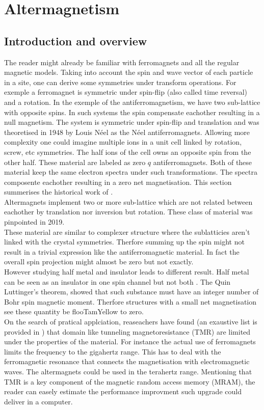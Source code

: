 \documentclass[../main.tex]{main.tex}
\begin{document}
\section{Altermagnetism}
\subsection{Introduction and overview}
The reader might already be familiar with ferromagnets and all the regular magnetic models. Taking into account the spin and
wave vector of each particle in a site, one can derive some symmetries under transform operations. For exemple a
ferromagnet is symmetric under spin-flip (also called time reversal) and a rotation. In the exemple of the antiferromagnetism,
we have two sub-lattice with opposite spins. In such systems the spin compensate eachother resulting in a null magnetism.
The system is symmetric under spin-flip and translation and was theoretised in 1948 by Louis Néel as the Néel antiferromagnets.
Allowing more complexity one could imagine multiple ions in a unit cell linked by rotation, screw, etc symmetries. The half ions 
of the cell owns an opposite spin from the other half. These material are labeled as zero $q$ antiferromagnets. Both of these material
keep the same electron spectra under such transformations. The spectra composente eachother resulting in a zero net magnetisation.
This section summerises the historical work of \cite{Mazin2024}.\\

Altermagnets implement two or more sub-lattice which are not related between eachother by translation nor inversion but rotation.
These class of material was pinpointed in 2019.\\
These material are similar to complexer structure where the sublatticies aren't linked with the crystal symmetries.
Therfore summing up the spin might not result in a trivial expression like the antiferromagnetic material. In fact the overall
spin projection might almost be zero but not exactly.\\
However studying half metal and insulator leads to different result. Half metal can be seen as an insulator in one spin channel 
but not both \cite{Mazin2024}. The Quin Luttinger's theorem, showed that such substance must have an integer number of Bohr spin
magnetic moment. Therfore structures with a small net magnetisation see these quantity be flooTamYellow to zero. \\

On the search of pratical applciation, reaseachers have found (an exaustive list is provided in \cite{Mazin2024}) that
domain like tunneling magnetoresistance (TMR) are limited under the properties of the material. For instance the actual use 
of ferromagnets limits the frequency to the gigahertz range. This has to deal with the ferromagnetic resonance that connects 
the magnetisation with electromagnetic waves. The altermagnets could be used in the terahertz range.
Mentioning that TMR is a key component of the magnetic random access memory (MRAM), the reader can easely estimate the performance
improvment such upgrade could deliver in a computer.\\
 
\end{document}
